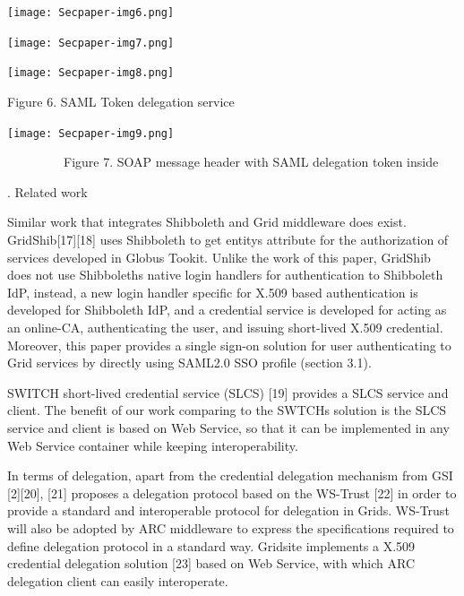 \documentclass{article}
\begin{document}
\bigskip



\begin{center}
\texttt{[image: Secpaper-img6.png]}
\end{center}
\begin{center}
\texttt{[image: Secpaper-img7.png]}
\end{center}
\begin{center}
\texttt{[image: Secpaper-img8.png]}
\end{center}
{\centering
Figure 6. SAML Token delegation service
\par}


\bigskip


\bigskip


\bigskip



\begin{center}
\texttt{[image: Secpaper-img9.png]}
\end{center}
{\centering
\ \ \ \ \ \ \ \ \ Figure 7. SOAP message header with SAML delegation
token inside
\par}


\bigskip

{. Related work
\par}

Similar work that integrates Shibboleth and Grid middleware does exist.
GridShib[17][18] uses Shibboleth to get entity{\textquotesingle}s
attribute for the authorization of services developed in Globus Tookit.
Unlike the work of this paper, GridShib does not use
Shibboleth{\textquotesingle}s native login handlers for authentication
to Shibboleth IdP, instead, a new login handler specific for X.509
based authentication is developed for Shibboleth IdP, and a credential
service is developed for acting as an online-CA, authenticating the
user, and issuing short-lived X.509 credential. Moreover, this paper
provides a single sign-on solution for user authenticating to Grid
services by directly using SAML2.0 SSO profile (section 3.1).

SWITCH short-lived credential service (SLCS) [19] provides a SLCS
service and client. The benefit of our work comparing to the
SWTCH{\textquotesingle}s solution is the SLCS service and client is
based on Web Service, so that it can be implemented in any Web Service
container while keeping interoperability.

In terms of delegation, apart from the credential delegation mechanism
from GSI [2][20], [21] proposes a delegation protocol based on the
WS-Trust [22] in order to provide a standard and interoperable protocol
for delegation in Grids. WS-Trust will also be adopted by ARC
middleware to express the specifications required to define delegation
protocol in a standard way. Gridsite implements a X.509 credential
delegation solution [23] based on Web Service, with which ARC
delegation client can easily interoperate. 
\end{document}
